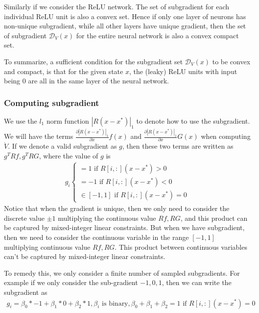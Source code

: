 \documentclass{article}
\begin{document}
Similarly if we consider the ReLU network. The set of subgradient for each individual ReLU unit is also a convex set. Hence if only one layer of neurons has non-unique subgradient, while all other layers have unique gradient, then the set of subgradient $\mathcal{D}_V(x)$ for the entire neural network is also a convex compact set.

To summarize, a sufficient condition for the subgradient set $\mathcal{D}_V(x)$ to be convex and compact, is that for the given state $x$, the (leaky) ReLU units with input being 0 are all in the same layer of the neural network.

\subsubsection{Computing subgradient}
We use the $l_1$ norm function $|R(x-x^*)|_1$ to denote how to use the subgradient. We will have the terms $\frac{\partial |R(x-x^*)|_1}{\partial x}f(x)$ and $\frac{\partial |R(x-x^*)|_1}{\partial x}G(x)$ when computing $\dot{V}$. If we denote a valid subgradient as $g$, then these two terms are written as $g^TRf, g^TRG$, where the value of $g$ is
\begin{align}
	g_i  \begin{cases}
		=1 \text{ if } R[i, :](x-x^*) > 0\\
		=-1 \text{ if } R[i, :](x-x^*) < 0\\
		\in[-1, 1] \text{ if } R[i, :](x-x^*)=0
	\end{cases}
\end{align}
Notice that when the gradient is unique, then we only need to consider the discrete value $\pm1$ multiplying the continuous value $Rf, RG$, and this product can be captured by mixed-integer linear constraints. But when we have subgradient, then we need to consider the continuous variable in the range $[-1, 1]$ multiplying continuous value $Rf, RG$. This product between continuous variables can't be captured by mixed-integer linear constraints.

To remedy this, we only consider a finite number of sampled subgradients. For example if we only consider the sub-gradient $-1, 0, 1$, then we can write the subgradient as
\begin{align}
	g_i = \beta_0*-1+\beta_1 * 0 + \beta_2 * 1, \beta_i \text{ is binary}, \beta_0 + \beta_1 + \beta_2 = 1 \text{ if } R[i, :] (x-x^*)=0
\end{align}
\end{document}
